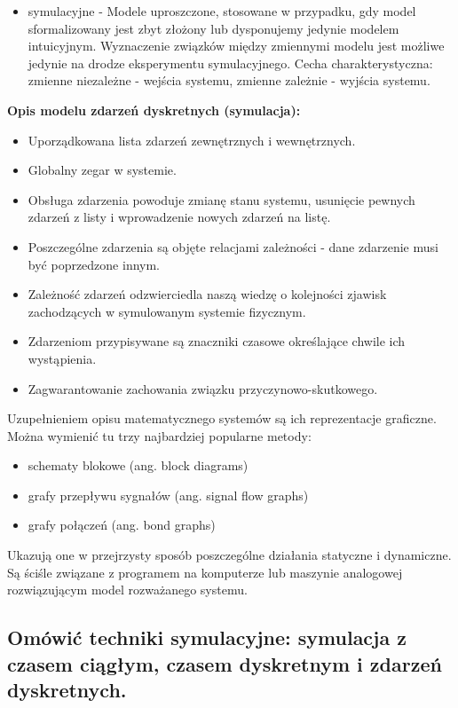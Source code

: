 \begin{description}
\begin{itemize}
        \item symulacyjne - Modele uproszczone, stosowane w przypadku, gdy model sformalizowany jest zbyt złożony lub dysponujemy jedynie modelem intuicyjnym. Wyznaczenie związków między zmiennymi modelu jest możliwe jedynie na drodze eksperymentu symulacyjnego. Cecha charakterystyczna: zmienne niezależne - wejścia systemu, zmienne zależnie - wyjścia systemu.
    \end{itemize}
\end{description}

\textbf{Opis modelu zdarzeń dyskretnych (symulacja):}
\begin{itemize}
    \item Uporządkowana lista zdarzeń zewnętrznych i wewnętrznych.
    \item Globalny zegar w systemie.
    \item Obsługa zdarzenia powoduje zmianę stanu systemu, usunięcie pewnych zdarzeń z listy i wprowadzenie nowych zdarzeń na listę.
    \item Poszczególne zdarzenia są objęte relacjami zależności - dane zdarzenie musi być poprzedzone innym.
    \item Zależność zdarzeń odzwierciedla naszą wiedzę o kolejności zjawisk zachodzących w symulowanym systemie fizycznym.
    \item Zdarzeniom przypisywane są znaczniki czasowe określające chwile ich wystąpienia.
    \item Zagwarantowanie zachowania związku przyczynowo-skutkowego.
\end{itemize}

Uzupełnieniem opisu matematycznego systemów są ich reprezentacje graficzne. Można wymienić tu trzy najbardziej popularne metody:
\begin{itemize}
    \item schematy blokowe (ang. block diagrams)
    \item grafy przepływu sygnałów (ang. signal flow graphs)
    \item grafy połączeń (ang. bond graphs)
\end{itemize}
Ukazują one w przejrzysty sposób poszczególne działania statyczne i dynamiczne. Są ściśle związane z programem na komputerze lub maszynie analogowej rozwiązującym model rozważanego systemu.

\subsection{Omówić techniki symulacyjne: symulacja z czasem ciągłym,
czasem dyskretnym i zdarzeń dyskretnych.} 


